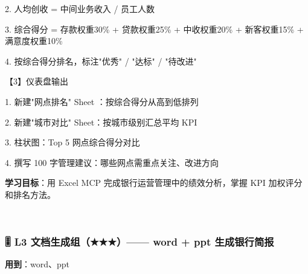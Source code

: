 \documentclass[
  american,
  chinese,
]{ctexart}
\begin{document}
\foreignlanguage{american}{2. }{人均创收}\foreignlanguage{american}{ = }{中间业务收入}\foreignlanguage{american}{ / }{员工人数}\foreignlanguage{american}{}

\foreignlanguage{american}{3. }{综合得分}\foreignlanguage{american}{ = }{存款权重}\foreignlanguage{american}{30\% + }{贷款权重}\foreignlanguage{american}{25\% + }{中收权重}\foreignlanguage{american}{20\% + }{新客权重}\foreignlanguage{american}{15\% + }{满意度权重}\foreignlanguage{american}{10\%}\foreignlanguage{american}{}

\foreignlanguage{american}{4. }{按综合得分排名，标注}\foreignlanguage{american}{"}{优秀}\foreignlanguage{american}{" / "}{达标}\foreignlanguage{american}{" / "}{待改进}\foreignlanguage{american}{"}

{【}\foreignlanguage{american}{3}{】仪表盘输出}\foreignlanguage{american}{}

\foreignlanguage{american}{1. }{新建}{"}{网点排名}{"} \foreignlanguage{american}{Sheet}{ }{：}\foreignlanguage{american}{}{按综合得分从高到低排列}\foreignlanguage{american}{}

\foreignlanguage{american}{2. }{新建}{"}{城市对比}\foreignlanguage{american}{" Sheet}{：按城市级别汇总平均}\foreignlanguage{american}{ KPI}

\foreignlanguage{american}{3. }{柱状图：}\foreignlanguage{american}{Top 5 }{网点综合得分对比}\foreignlanguage{american}{}

\foreignlanguage{american}{4. }{撰写}\foreignlanguage{american}{ 100 }{字管理建议：哪些网点需重点关注、改进方向}\foreignlanguage{american}{}

\textbf{{学习目标}}{：用}\foreignlanguage{american}{ Excel MCP }{完成银行运营管理中的绩效分析，掌握}\foreignlanguage{american}{ KPI }{加权评分和排名方法。}\foreignlanguage{american}{}

\foreignlanguage{american}{}

~

\subsubsection{\texorpdfstring{\foreignlanguage{american}{🎚️ L3 }{文档生成组（}\foreignlanguage{american}{★★★}{）}\foreignlanguage{american}{------ word + ppt }{生成银行简报}\foreignlanguage{american}{}}{🎚️ L3 文档生成组（★★★）------ word + ppt 生成银行简报}}\label{l3-ux6587ux6863ux751fux6210ux7ec4-word-ppt-ux751fux6210ux94f6ux884cux7b80ux62a5}

{\textbf{\foreignlanguage{american}{用到}}\foreignlanguage{american}{：}\foreignlanguage{american}{word}\foreignlanguage{american}{、}\foreignlanguage{american}{ppt}}
\end{document}
